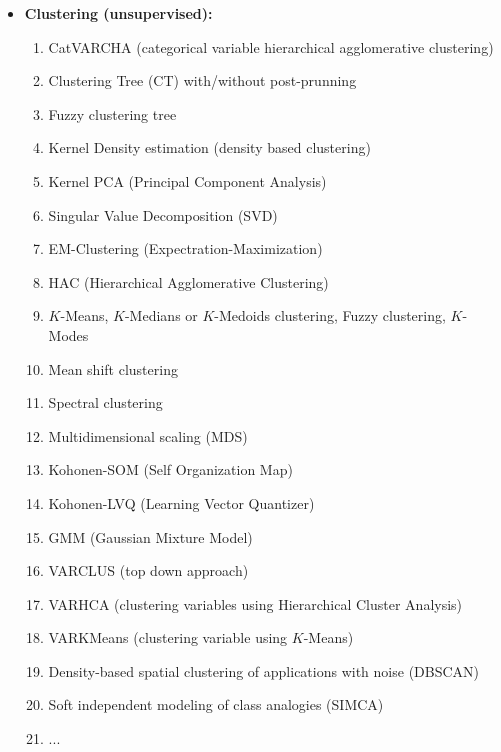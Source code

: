 \begin{itemize}
		\item \textbf{Clustering (unsupervised):}
		\begin{enumerate}
			\item CatVARCHA (categorical variable hierarchical agglomerative clustering)
			\item Clustering Tree (CT) with/without post-prunning
			\item Fuzzy clustering tree
			\item Kernel Density estimation (density based clustering)
			\item Kernel PCA (Principal Component Analysis)
			\item Singular Value Decomposition (SVD)
			\item EM-Clustering (Expectration-Maximization)
			\item HAC (Hierarchical Agglomerative Clustering)
			\item $K$-Means, $K$-Medians or $K$-Medoids clustering, Fuzzy clustering, $K$-Modes
			\item Mean shift clustering
			\item Spectral clustering
			\item Multidimensional scaling (MDS)
			\item Kohonen-SOM (Self Organization Map)
			\item Kohonen-LVQ (Learning Vector Quantizer)
			\item GMM (Gaussian Mixture Model)
			\item VARCLUS (top down approach)
			\item VARHCA (clustering variables using Hierarchical Cluster Analysis)
			\item VARKMeans (clustering variable using $K$-Means)
			\item Density-based spatial clustering of applications with noise (DBSCAN)
			\item Soft independent modeling of class analogies (SIMCA)
			\item ...
		\end{enumerate}
		

\end{itemize}
